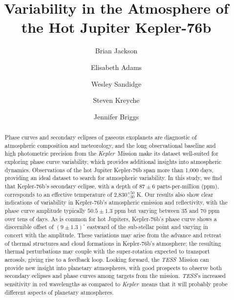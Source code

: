 \documentclass[manuscript]{aastex62}
\newcommand{\kepler}{{\it Kepler}}
\newcommand{\tess}{{\it TESS}}
\begin{document}
\title{Variability in the Atmosphere of the Hot Jupiter Kepler-76b}


\author{Brian Jackson}

\author{Elisabeth Adams}

\author{Wesley Sandidge}

\author{Steven Kreyche}

\author{Jennifer Briggs}





\begin{abstract}
Phase curves and secondary eclipses of gaseous exoplanets are diagnostic of atmospheric composition and meteorology, and the long observational baseline and high photometric precision from the \kepler\ Mission make its dataset well-suited for exploring phase curve variability, which provides additional insights into atmospheric dynamics. Observations of the hot Jupiter Kepler-76b span more than 1,000 days, providing an ideal dataset to search for atmospheric variability. In this study, we find that Kepler-76b's secondary eclipse, with a depth of $87 \pm 6$ parts-per-million (ppm), corresponds to an effective temperature of 2,830$^{+50}_{-30}$ K. Our results also show clear indications of variability in Kepler-76b's atmospheric emission and reflectivity, with the phase curve amplitude typically $50.5 \pm 1.3$ ppm but varying between 35 and 70 ppm over tens of days. As is common for hot Jupiters, Kepler-76b's phase curve shows a discernible offset of $\left( 9 \pm 1.3 \right)^\circ$ eastward of the sub-stellar point and varying in concert with the amplitude. These variations may arise from the advance and retreat of thermal structures and cloud formations in Kepler-76b's atmosphere; the resulting thermal perturbations may couple with the super-rotation expected to transport aerosols, giving rise to a feedback loop. Looking forward, the \tess\ Mission can provide new insight into planetary atmospheres, with good prospects to observe both secondary eclipses and phase curves among targets from the mission. \tess's increased sensitivity in red wavelengths as compared to \kepler\ means that it will probably probe different aspects of planetary atmospheres.

\end{abstract}
\end{document}
